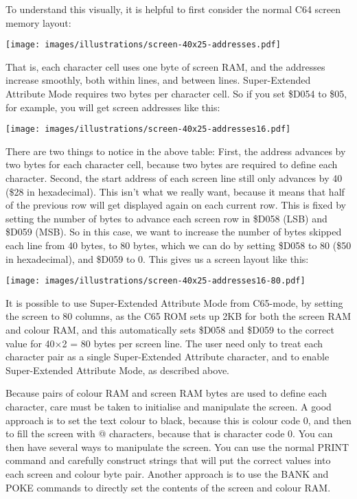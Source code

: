 To understand this visually, it is helpful to first consider the normal C64 screen memory layout:

\texttt{[image: images/illustrations/screen-40x25-addresses.pdf]}

That is, each character cell uses one byte of screen RAM, and the addresses increase smoothly, both within lines, and between lines.
Super-Extended Attribute Mode requires two bytes per character cell. So if you set \$D054 to \$05, for example, you will get screen addresses like this:

\texttt{[image: images/illustrations/screen-40x25-addresses16.pdf]}

There are two things to notice in the above table: First, the address advances by two bytes for each character cell, because two bytes are required to define each character.  Second, the start address of each screen line still only advances by 40 (\$28 in hexadecimal). This isn't what we really want, because it means that half of the previous row will get displayed again on each current row.  This is fixed by setting the number of bytes to advance each screen row in \$D058 (LSB) and \$D059 (MSB). So in this case, we want to increase the number of bytes skipped each line from 40 bytes, to 80 bytes, which we can do by setting \$D058 to 80 (\$50 in hexadecimal), and \$D059 to 0.  This gives us a screen layout like this:

\texttt{[image: images/illustrations/screen-40x25-addresses16-80.pdf]}

It is possible to use Super-Extended Attribute Mode from C65-mode, by setting the screen to 80 columns, as the C65 ROM sets up 2KB for both the screen RAM and colour RAM, and this automatically sets \$D058 and \$D059 to the correct value for 40$\times$2 = 80 bytes per screen line.  The user need only to treat each character pair as a single Super-Extended Attribute character, and to enable Super-Extended Attribute Mode, as described above.

Because pairs of colour RAM and screen RAM bytes are used to define each character, care must be taken to initialise and manipulate the screen.
A good approach is to set the text colour to black, because this is colour code 0, and then to fill the screen with @ characters, because that is
character code 0.  You can then have several ways to manipulate the screen.  You can use the normal PRINT command and carefully construct
strings that will put the correct values into each screen and colour byte pair. Another approach is to use the BANK and POKE commands to directly set the contents of the screen and colour RAM.

